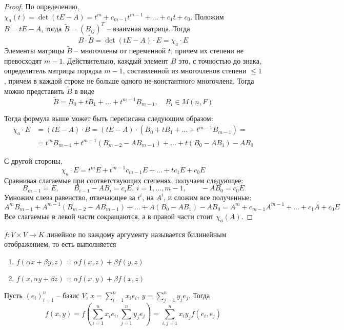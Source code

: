 \begin{proof}
	По определению, $\chi_a(t) = \det (tE-A) = t^m + c_{m - 1}t^{m - 1} + ... + c_1 t + c_0$. Положим $B = tE-A$, тогда $\widetilde{B} = (B_{ij})^T$ -- взаимная матрица.
	Тогда
	\[B \cdot \widetilde{B} = \det(tE - A) \cdot E = \chi_a \cdot E\]
	Элементы матрицы $\widetilde{B}$ -- многочлены от переменной $t$, причем их степени не превосходят $m - 1$.
	Действительно, каждый элемент $B$ это, с точностью до знака, определитель матрицы порядка $m - 1$, составленной из многочленов степени $\leqslant 1$, причем в каждой строке не больше одного не-константного многочлена.
	Тогда можно представить $\widetilde{B}$ в виде 
	\[\widetilde{B} = B_0 + tB_1 + ... + t^{m - 1}B_{m - 1}, \quad B_i \in M(n, F)\] 

	Тогда формула выше может быть переписана следующим образом:
	\begin{align*}
		\chi_a \cdot E &= (tE - A) \cdot B = (tE - A) \cdot (B_0 + tB_1 + ... + t^{m - 1}B_{m - 1}) = \\
		&= t^m B_{m - 1} + t^{m - 1}(B_{m - 2} - AB_{m - 1}) + ... + t(B_0 - AB_1) - AB_0
	\end{align*}

	С другой стороны,
	\[\chi_a \cdot E = t^m E + t^{m - 1}c_{m - 1}E + ... + tc_1 E + c_0 E\]
	Сравнивая слагаемые при соответствующих степенях, получаем следующее:
	\[B_{m - 1} = E, \qquad B_{i - 1} - AB_i = c_i E, \ i = 1, ..., m - 1, \qquad -AB_0 = c_0 E\]
	Умножим слева равенство, отвечающее за $t^i$, на $A^i$, и сложим все полученные:
	\[A^m B_{m - 1} + A^{m - 1}(B_{m - 2} - AB_{m - 1}) + ... + A(B_0 - AB_1) - AB_0 = A^m  + c_{m - 1}A^{m - 1} + ... + c_1A + c_0 E\]
	Все слагаемые в левой части сокращаются, а в правой части стоит $\chi_a(A)$.  
\end{proof}

\begin{Def} 
	$f: V \times V \to K$ линейное по каждому аргументу называется билинейным отображением, то есть выполняется
	\begin{enumerate}
		\item $f(\alpha x + \beta y, z) = \alpha f(x,z) + \beta f(y,z)$
		\item $f(x, \alpha y + \beta z) = \alpha f(x, y) + \beta f(x, z)$
	\end{enumerate}
\end{Def} 

\begin{Rem}
	Пусть 	$(e_i)_{i=1}^n$ -- базис $V$, $x = \sum_{i=1}^{n} x_ie_i, \ y = \sum_{j=1}^{n} y_je_j$. 
	Тогда 
	\[f(x, y) = f\left(\sum_{i = 1}^n x_ie_i, \sum_{j = 1}^n y_je_j\right) = \sum_{i, j = 1}^{n} x_i y_j f(e_i, e_j)\]
\end{Rem}

